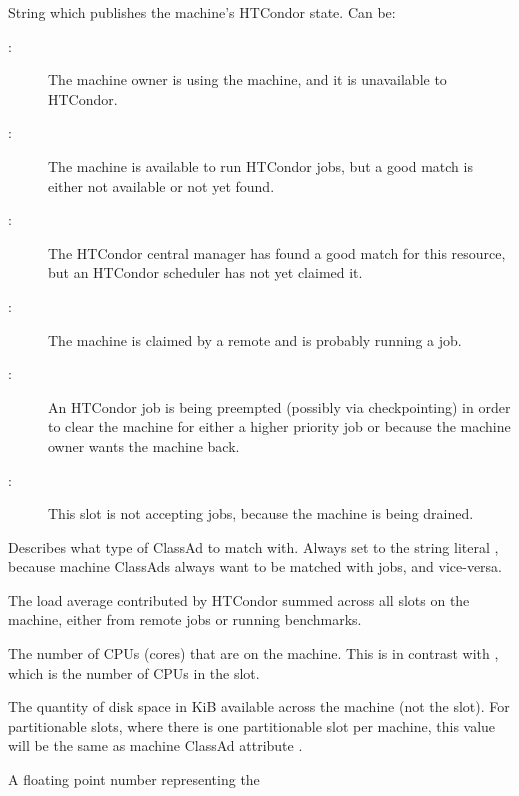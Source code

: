 \begin{description}
%
\item[\AdAttr{State}:] String which publishes the machine's HTCondor state.
Can be:
	\begin{description}
	\item[:] The machine owner is using the machine, and
it is unavailable to HTCondor.
	\item[:] The machine is available to run HTCondor jobs,
but a good match is either not available or not 
yet found.
	\item[:] The HTCondor central manager has found a good
match for this resource, but an HTCondor scheduler has not yet claimed it.
	\item[:] The machine is claimed by a remote
 and is probably running a job.
	\item[:] An HTCondor job is being preempted (possibly
via checkpointing) in order to clear the machine for either a higher
priority job or because the machine owner wants the machine back.
	\item[:] This slot is not accepting jobs,
because the machine is being drained.
	\end{description}   %
%
\item[\AdAttr{TargetType}:] Describes what type of ClassAd to match with.
Always set to the string literal , because machine ClassAds
always want to be matched with jobs, and vice-versa.
%
\item[\AdAttr{TotalCondorLoadAvg}:] The load average contributed  
by HTCondor summed across all slots on the machine, 
either from remote jobs or running benchmarks.
%
\item[\AdAttr{TotalCpus}:] The number of CPUs (cores) that are on the machine.
This is in contrast with ,
which is the number of CPUs in the slot.
%
\item[\AdAttr{TotalDisk}:] The quantity of disk space in KiB
available across the machine (not the slot).
For partitionable slots,
where there is one partitionable slot per machine, this value will be
the same as machine ClassAd attribute .
%
\item[\AdAttr{TotalLoadAvg}:] A floating point number representing the 

\end{description}
